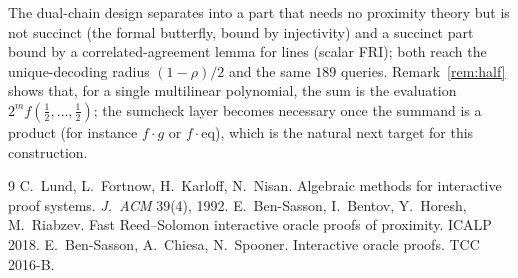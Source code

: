 \documentclass[11pt]{article}
\theoremstyle{definition}
\begin{document}
The dual-chain design separates into a part that needs no proximity theory but is not succinct (the formal butterfly, bound by injectivity) and a succinct part bound by a correlated-agreement lemma for lines (scalar FRI); both reach the unique-decoding radius $(1-\rho)/2$ and the same $189$ queries. Remark~\ref{rem:half} shows that, for a single multilinear polynomial, the sum is the evaluation $2^mf(\frac12,\dots,\frac12)$; the sumcheck layer becomes necessary once the summand is a product (for instance $f\cdot g$ or $f\cdot\mathrm{eq}$), which is the natural next target for this construction.

\begin{thebibliography}{9}
 C.~Lund, L.~Fortnow, H.~Karloff, N.~Nisan. Algebraic methods for interactive proof systems. \emph{J.\ ACM} 39(4), 1992.
 E.~Ben-Sasson, I.~Bentov, Y.~Horesh, M.~Riabzev. Fast Reed--Solomon interactive oracle proofs of proximity. ICALP 2018.
 E.~Ben-Sasson, A.~Chiesa, N.~Spooner. Interactive oracle proofs. TCC 2016-B.
\end{thebibliography}
\end{document}
